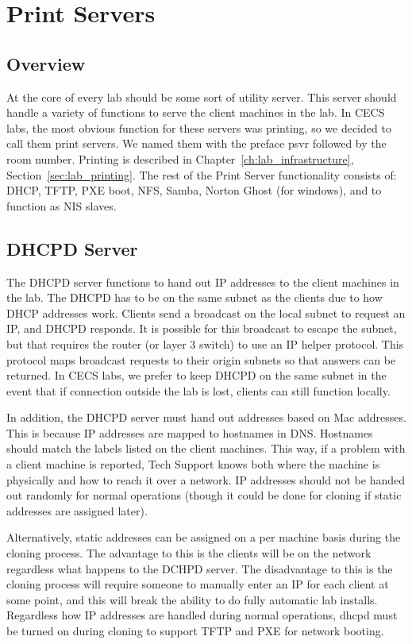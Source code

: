 \section{Print Servers} \label{sec:printservers}
\subsection{Overview}
At the core of every lab should be some sort of utility server.  This server should handle a variety of functions to serve the client machines in the lab.  In CECS labs, the most obvious function for these servers was printing, so we decided to call them print servers. We named them with the preface psvr followed by the room number.  Printing is described in Chapter~\ref{ch:lab_infrastructure}, Section~\ref{sec:lab_printing}.  The rest of the Print Server functionality consists of:  DHCP, TFTP, PXE boot, NFS, Samba, Norton Ghost (for windows), and to function as NIS slaves.
\subsection{DHCPD Server}
The DHCPD server functions to hand out IP addresses to the client machines in the lab.  The DHCPD has to be on the same subnet as the clients due to how DHCP addresses work.  Clients send a broadcast on the local subnet to request an IP, and DHCPD responds.  It is possible for this broadcast to escape the subnet, but that requires the router (or layer 3 switch) to use an IP helper protocol.  This protocol maps broadcast requests to their origin subnets so that answers can be returned.  In CECS labs, we prefer to keep DHCPD on the same subnet in the event that if connection outside the lab is lost, clients can still function locally.  

In addition, the DHCPD server must hand out addresses based on Mac addresses.  This is because IP addresses are mapped to hostnames in DNS.  Hostnames should match the labels listed on the client machines.  This way, if a problem with a client machine is reported, Tech Support knows both where the machine is physically and how to reach it over a network.  IP addresses should not be handed out randomly for normal operations (though it could be done for cloning if static addresses are assigned later).  

Alternatively, static addresses can be assigned on a per machine basis during the cloning process.  The advantage to this is the clients will be on the network regardless what happens to the DCHPD server.  The disadvantage to this is the cloning process will require someone to manually enter an IP for each client at some point, and this will break the ability to do fully automatic lab installs.   Regardless how IP addresses are handled during normal operations, dhcpd must be turned on during cloning to support TFTP and PXE for network booting.  

